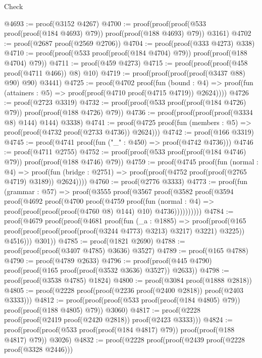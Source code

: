 \begin{lexlean}{Check}
\begin{coremodule}
@4693 := proof(@3152 @4267)
@4700 := proof(proof(proof(@533 proof(proof(@184 @4693) @79)) proof(proof(@188 @4693) @79)) @3161)
@4702 := proof(@2687 proof(@2569 @2706))
@4704 := proof(proof(@333 @4273) @338)
@4710 := proof(proof(@533 proof(proof(@184 @4704) @79)) proof(proof(@188 @4704) @79))
@4711 := proof(@459 @4273)
@4715 := proof(proof(proof(@458 proof(@4711 @466)) @8) @10)
@4719 := proof(proof(proof(proof(@3437 @88) @90) @90) @3441)
@4725 := proof(@4702
      proof(fun (bound : @4) =>
        proof(fun (attainers : @5) => proof(proof(@4710 proof(@4715 @4719)) @2624))))
@4726 := proof(@2723 @3319)
@4732 := proof(proof(@533 proof(proof(@184 @4726) @79)) proof(proof(@188 @4726) @79))
@4736 := proof(proof(proof(proof(@3334 @8) @144) @144) @3338)
@4741 := proof(@4725 proof(fun (members : @5) => proof(proof(@4732 proof(@2733 @4736)) @2624)))
@4742 := proof(@166 @3319)
@4745 := proof(@4741 proof(fun ("_" : @450) => proof(@4742 @4736)))
@4746 := proof(@4711 @2755)
@4752 := proof(proof(@533 proof(proof(@184 @4746) @79)) proof(proof(@188 @4746) @79))
@4759 := proof(@4745
      proof(fun (normal : @4) =>
        proof(fun (bridge : @2751) => proof(proof(@4752 proof(proof(@2765 @4719) @3189)) @2624))))
@4760 := proof(@2776 @3333)
@4773 := proof(fun (grammar : @57) =>
    proof(@3555
        proof(@3567
            proof(@3582
                proof(@3594
                    proof(@4692
                        proof(@4700
                            proof(@4759
                                proof(fun (normal : @4) =>
                                  proof(proof(proof(proof(@4760 @8) @144) @10) @4736))))))))))
@4784 := proof(@4679
      proof(proof(@4681
            proof(fun (_a : @1885) =>
              proof(proof(@165
                    proof(proof(proof(proof(proof(@3244 @4773) @3213) @3217) @3221) @3225))
                  @4516)))
          @301))
@4785 := proof(@1821 @2690)
@4788 := proof(proof(proof(@3407 @4785) @3636) @3527)
@4789 := proof(@165 @4788)
@4790 := proof(@4789 @2633)
@4796 := proof(proof(@445 @4790) proof(proof(@165 proof(proof(@3532 @3636) @3527)) @2633))
@4798 := proof(proof(@3538 @4785) @1824)
@4800 := proof(@3084 proof(@1888 @2818))
@4805 := proof(@2228 proof(proof(@2236 proof(@2400 @2818)) proof(@2403 @3333)))
@4812 := proof(proof(proof(@533 proof(proof(@184 @4805) @79)) proof(proof(@188 @4805) @79)) @3060)
@4817 := proof(@2228 proof(proof(@2419 proof(@2420 @2818)) proof(@2423 @3333)))
@4824 := proof(proof(proof(@533 proof(proof(@184 @4817) @79)) proof(proof(@188 @4817) @79)) @3026)
@4832 := proof(@2228
      proof(proof(@2439 proof(@2228 proof(@3328 @2446)))

\end{coremodule}
\end{lexlean}
